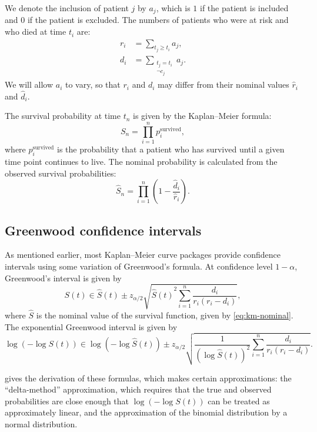 \documentclass[article]{jss}
\newcommand{\KM}{Kaplan--Meier} %
\begin{document}
We denote the inclusion of patient \(j\) by \(a_j\), which is \(1\) if the patient is included and \(0\) if the patient is excluded.  The numbers of patients who were at risk and who died at time \(t_i\) are:
\begin{align}
r_i &= \sum_{t_j \geq t_i} a_j, \\
d_i &= \sum_{\substack{t_j = t_i \\ \neg c_j}} a_j.
\end{align}
We will allow \(a_i\) to vary, so that \(r_i\) and \(d_i\) may differ from their nominal values \(\hat{r}_i\) and \(\hat{d}_i\).

The survival probability at time \(t_n\) is given by the \KM{} formula:
\begin{equation}
S_n = \prod_{i=1}^{n} p_i^\text{survived}, \label{eq:km-survival}
\end{equation}
where \(p_i^\text{survived}\) is the probability that a patient who has survived until a given time point continues to live.  The nominal probability is calculated from the observed survival probabilities:
\begin{equation}
\hat{S}_n = \prod_{i=1}^{n} \left(1 - \frac{\hat{d}_i}{\hat{r}_i}\right). \label{eq:km-nominal}
\end{equation}

\subsection{Greenwood confidence intervals}\label{sec:greenwood}

As mentioned earlier, most \KM{} curve packages provide confidence intervals using some variation of Greenwood's formula.  At confidence level \(1-\alpha\), Greenwood's interval is given by
\begin{equation}
\label{eq:greenwood}
S(t)\in\hat{S}(t) \pm z_{\alpha/2} \sqrt{{\hat{S}(t)}^2{\sum_{i=1}^{n} \frac{d_i}{r_i(r_i-d_i)}}},
\end{equation}
where \(\hat{S}\) is the nominal value of the survival function, given by \cref{eq:km-nominal}.  The exponential Greenwood interval is given by
\begin{equation}
\label{eq:exponential-greenwood}
\log{\left(-\log S(t)\right)} \in \log{\left(-\log \hat{S}(t)\right)} \pm z_{\alpha/2} \sqrt{\frac{1}{{\left(\log \hat{S}(t)\right)}^2} \sum_{i=1}^{n} \frac{d_i}{r_i(r_i-d_i)}}.
\end{equation}

\citet{GreenwoodNotes} gives the derivation of these formulas, which makes certain approximations: the ``delta-method'' approximation, which requires that the true and observed probabilities are close enough that \(\log\left(-\log S(t)\right)\) can be treated as approximately linear, and the approximation of the binomial distribution by a normal distribution.
\end{document}
